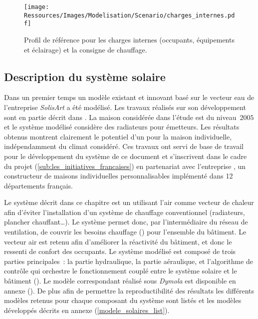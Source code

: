 \begin{figure}
    \centering
    \texttt{[image: Ressources/Images/Modelisation/Scenario/charges\_internes.pdf]}
    \caption[Profil de référence pour les charges internes et la consigne de chauffage]
            {Profil de référence pour les charges internes (occupants, équipements et éclairage)
             et la consigne de chauffage.}
    \label{fig:scenario_reference}
\end{figure}


\subsection{Description du système solaire} %
\label{sub:description_du_systeme_solaire}
Dans un premier temps un modèle existant et innovant basé sur le vecteur eau
de l’entreprise \textit{SolisArt} a été modélisé. Les travaux réalisés sur son
développement sont en partie décrit dans \textcite{Bois2015}. La maison considérée dans
l’étude est du niveau \,$2005$ et le système modélisé considère des radiateurs
pour émetteurs. Les résultats obtenus montrent clairement le potentiel d’un 
pour la maison individuelle, indépendamment du climat considéré. Ces travaux
ont servi de base de travail pour le développement du système de ce document et
s’inscrivent dans le cadre du projet  (\ref{sub:les_initiatives_francaises})
en partenariat avec l’entreprise , un constructeur de maisons individuelles
personnalisables implémenté dans \num{12} départements français.

Le système décrit dans ce chapitre est un  utilisant l’air comme vecteur de chaleur
afin d’éviter l’installation d’un système de chauffage conventionnel (radiateurs, plancher
chauffant\dots). Le système permet donc, par l’intermédiaire du réseau de ventilation, de
couvrir les besoins chauffage () pour l’ensemble du bâtiment.
Le vecteur air est retenu afin d’améliorer la réactivité du bâtiment, et donc le
ressenti de confort des occupants. Le système modélisé est composé de trois
parties principales~: la partie hydraulique, la partie aéraulique, et l’algorithme de
contrôle qui orchestre le fonctionnement couplé entre le système solaire et le bâtiment
(). Le modèle correspondant réalisé sous \textit{Dymola} est disponible
en annexe ().
De plus afin de permettre la reproductibilité des résultats les différents
modèles retenus pour chaque composant du système sont listés et les modèles développés
décrits en annexe (\ref{modele_solaires_list}).

